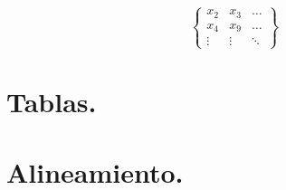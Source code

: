 \documentclass{article}
\begin{document}
\[
	\begin{Bmatrix}
		x_{2} & x_{3} & \dots \\
		x_{4} & x_{9} & \dots \\
		\vdots & \vdots & \ddots
	\end{Bmatrix}	
\]
\section*{Tablas.}

\section*{Alineamiento.}
	
	
\end{document}
